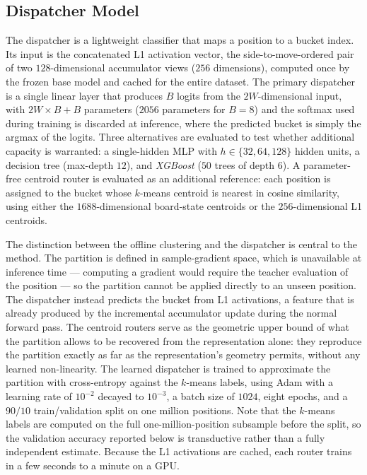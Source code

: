 \subsection{Dispatcher Model}

The dispatcher is a lightweight classifier that maps a position to a bucket index. Its input is the concatenated L1 activation vector, the side-to-move-ordered pair of two $128$-dimensional accumulator views ($256$ dimensions), computed once by the frozen base model and cached for the entire dataset. The primary dispatcher is a single linear layer that produces $B$ logits from the $2W$-dimensional input, with $2W \times B + B$ parameters ($2056$ parameters for $B = 8$) and the softmax used during training is discarded at inference, where the predicted bucket is simply the argmax of the logits. Three alternatives are evaluated to test whether additional capacity is warranted: a single-hidden MLP with $h \in \{32, 64, 128\}$ hidden units, a decision tree (max-depth $12$), and \emph{XGBoost} ($50$ trees of depth $6$). A parameter-free centroid router is evaluated as an additional reference: each position is assigned to the bucket whose $k$-means centroid is nearest in cosine similarity, using either the $1688$-dimensional board-state centroids or the $256$-dimensional L1 centroids.

The distinction between the offline clustering and the dispatcher is central to the method. The partition is defined in sample-gradient space, which is unavailable at inference time --- computing a gradient would require the teacher evaluation of the position --- so the partition cannot be applied directly to an unseen position. The dispatcher instead predicts the bucket from L1 activations, a feature that is already produced by the incremental accumulator update during the normal forward pass. The centroid routers serve as the geometric upper bound of what the partition allows to be recovered from the representation alone: they reproduce the partition exactly as far as the representation's geometry permits, without any learned non-linearity. The learned dispatcher is trained to approximate the partition with cross-entropy against the $k$-means labels, using Adam with a learning rate of $10^{-2}$ decayed to $10^{-3}$, a batch size of $1024$, eight epochs, and a $90/10$ train/validation split on one million positions. Note that the $k$-means labels are computed on the full one-million-position subsample before the split, so the validation accuracy reported below is transductive rather than a fully independent estimate. Because the L1 activations are cached, each router trains in a few seconds to a minute on a GPU.

